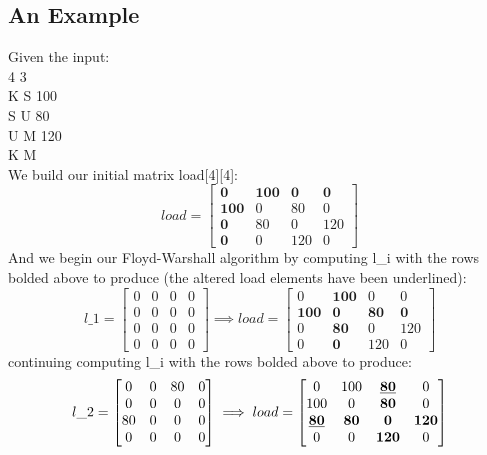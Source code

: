 \documentclass[12pt]{article}
\begin{document}
\subsection{An Example}
Given the input: \\
4 3     \\
K S 100 \\
S U 80  \\
U M 120 \\
K M     \\
We build our initial matrix load[4][4]:
\[  load =
\begin{bmatrix}
    \textbf{0}   & \textbf{100} & \textbf{0}   & \textbf{0}   \\
    \textbf{100} & 0   & 80  & 0   \\
    \textbf{0}   & 80  & 0   & 120 \\
    \textbf{0}   & 0   & 120 & 0
\end{bmatrix}
\]
And we begin our Floyd-Warshall algorithm by computing l\_i with the rows bolded
above to produce (the altered load elements have been underlined):
\[  l\_1 =
\begin{bmatrix}
    0   & 0   & 0   & 0   \\
    0   & 0   & 0   & 0   \\
    0   & 0   & 0   & 0   \\
    0   & 0   & 0   & 0
\end{bmatrix}
\implies load =
\begin{bmatrix}
    0   & \textbf{100} & 0   & 0   \\
    \textbf{100} & \textbf{0}   & \textbf{80}  & \textbf{0}   \\
    0   & \textbf{80}  & 0   & 120 \\
    0   & \textbf{0}   & 120 & 0
\end{bmatrix}
\]
continuing computing l\_i with the rows bolded above to produce:
\[  l\_2 =
\begin{bmatrix}
    0   & 0   & 80   & 0   \\
    0   & 0   & 0   & 0   \\
    80   & 0   & 0   & 0   \\
    0   & 0   & 0   & 0
\end{bmatrix}
\implies load =
\begin{bmatrix}
    0   & 100 & \textbf{\underline{80}}  & 0   \\
    100 & 0   & \textbf{80}  & 0   \\
    \textbf{\underline{80}}  & \textbf{80}  & \textbf{0}   & \textbf{120} \\
    0   & 0   & \textbf{120} & 0
\end{bmatrix}
\]
\end{document}
